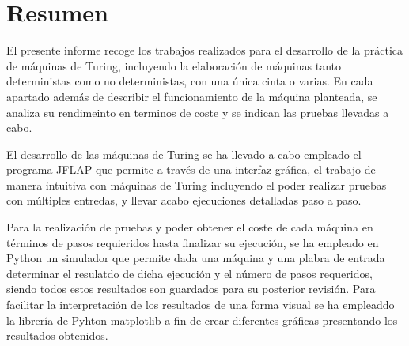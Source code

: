 \part{Resumen}

El presente informe recoge los trabajos realizados para el desarrollo de la práctica de máquinas de Turing, incluyendo la elaboración de máquinas tanto deterministas como no deterministas, con una única cinta o varias. En cada apartado además de describir el funcionamiento de la máquina planteada, se analiza su rendimeinto en terminos de coste y se indican las pruebas llevadas a cabo.\medskip

El desarrollo de las máquinas de Turing se ha llevado a cabo empleado el programa JFLAP \parencite{jflap} que permite a través de una interfaz gráfica, el trabajo de manera intuitiva con máquinas de Turing incluyendo el poder realizar pruebas con múltiples entredas, y llevar acabo ejecuciones detalladas paso a paso.\medskip

Para la realización de pruebas y poder obtener el coste de cada máquina en términos de pasos requieridos hasta finalizar su ejecución, se ha empleado en Python un simulador que permite dada una máquina y una plabra de entrada determinar el resulatdo de dicha ejecución y el número de pasos requeridos, siendo todos estos resultados son guardados para su posterior revisión. Para facilitar la interpretación de los resultados de una forma visual se ha empleaddo la librería de Pyhton matplotlib a fin de crear diferentes gráficas presentando los resultados obtenidos.
